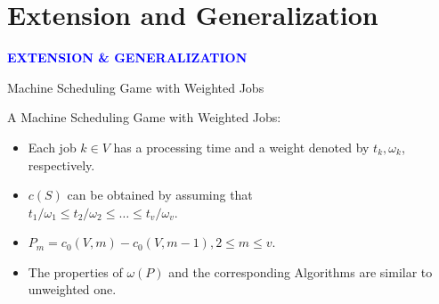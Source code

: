 \documentclass[14pt]{beamer}
\begin{document}
\section{Extension and Generalization}
\begin{frame}
\centering
\large
\textcolor{blue}{\bf {\huge E}XTENSION \&  {\huge G}ENERALIZATION}
\end{frame}

\begin{frame}{Machine Scheduling Game with Weighted Jobs}
	\begin{definition}
	\small
	\justifying
	A Machine Scheduling Game with Weighted Jobs:\\
	\begin{itemize}
		\justifying
			\item Each job $k \in V$ has a processing time and a weight denoted by $t_k,\omega_k$, respectively.
			\vspace{2pt}
			\item $c(S)$ can be obtained by assuming that\\
			\quad $t_1/\omega_1 \leq t_2/\omega_2 \leq \ldots \leq t_v/\omega_v$.
			\vspace{2pt}
			\item $P_m = c_0(V,m)- c_0(V,m-1), 2 \leq m \leq v$.
			\item The properties of $\omega(P)$ and the corresponding Algorithms are similar to unweighted one.
	\end{itemize}
	\end{definition}
\end{frame}
\end{document}
